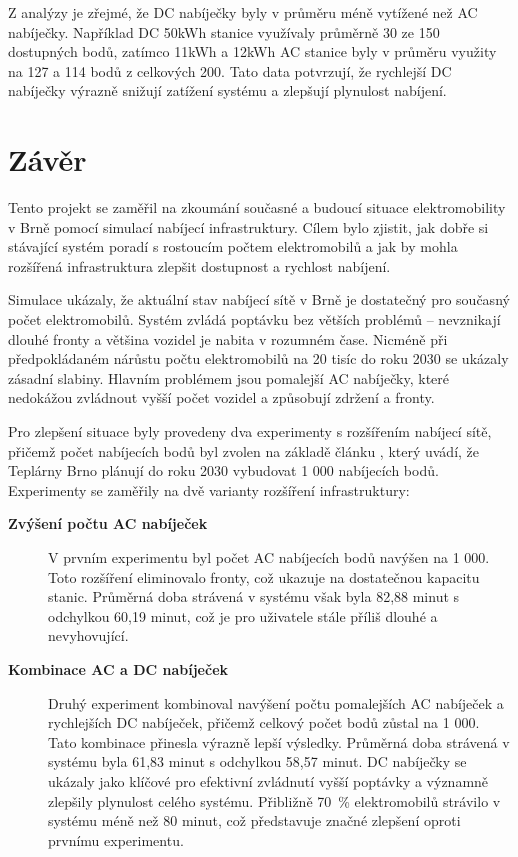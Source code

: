 \documentclass[a4paper,11pt]{article}
\begin{document}
Z analýzy je zřejmé, že DC nabíječky byly v průměru méně vytížené než AC nabíječky. Například DC 50kWh stanice využívaly průměrně 30 ze 150 dostupných bodů, zatímco 11kWh a 12kWh AC stanice byly v průměru využity na 127 a 114 bodů z celkových 200. Tato data potvrzují, že rychlejší DC nabíječky výrazně snižují zatížení systému a zlepšují plynulost nabíjení.

\section{Závěr}
Tento projekt se zaměřil na zkoumání současné a budoucí situace elektromobility v Brně pomocí simulací nabíjecí infrastruktury. Cílem bylo zjistit, jak dobře si stávající systém poradí s rostoucím počtem elektromobilů a jak by mohla rozšířená infrastruktura zlepšit dostupnost a rychlost nabíjení.

Simulace ukázaly, že aktuální stav nabíjecí sítě v Brně je dostatečný pro současný počet elektromobilů. Systém zvládá poptávku bez větších problémů – nevznikají dlouhé fronty a většina vozidel je nabita v rozumném čase. Nicméně při předpokládaném nárůstu počtu elektromobilů na 20 tisíc do roku 2030 se ukázaly zásadní slabiny. Hlavním problémem jsou pomalejší AC nabíječky, které nedokážou zvládnout vyšší počet vozidel a způsobují zdržení a fronty.

Pro zlepšení situace byly provedeny dva experimenty s rozšířením nabíjecí sítě, přičemž počet nabíjecích bodů byl zvolen na základě článku \cite{ev_growth}, který uvádí, že Teplárny Brno plánují do roku 2030 vybudovat 1 000 nabíjecích bodů. Experimenty se zaměřily na dvě varianty rozšíření infrastruktury:

\begin{description}
    \item[\textbf{Zvýšení počtu AC nabíječek}] V prvním experimentu byl počet AC nabíjecích bodů navýšen na 1 000. Toto rozšíření eliminovalo fronty, což ukazuje na dostatečnou kapacitu stanic. Průměrná doba strávená v systému však byla 82,88 minut s odchylkou 60,19 minut, což je pro uživatele stále příliš dlouhé a nevyhovující.
    \item[\textbf{Kombinace AC a DC nabíječek}] Druhý experiment kombinoval navýšení počtu pomalejších AC nabíječek a rychlejších DC nabíječek, přičemž celkový počet bodů zůstal na 1 000. Tato kombinace přinesla výrazně lepší výsledky. Průměrná doba strávená v systému byla 61,83 minut s odchylkou 58,57 minut. DC nabíječky se ukázaly jako klíčové pro efektivní zvládnutí vyšší poptávky a významně zlepšily plynulost celého systému. Přibližně 70~\% elektromobilů strávilo v systému méně než 80 minut, což představuje značné zlepšení oproti prvnímu experimentu.
\end{description}
\end{document}
